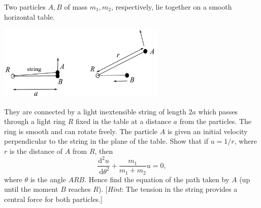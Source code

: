 \documentclass[answers]{exam}
\begin{document}
\begin{questions}
\question%
Two particles $A, B$ of mass $m_{1}, m_{2}$, respectively, lie together on a smooth horizontal table.
\begin{center}\includegraphics[width=8cm]{sheet 6 diagram}\end{center}
They are connected by a light inextensible string of length $2 a$ which passes through a light ring $R$ fixed in the table at a distance $a$ from the particles. The ring is smooth and can rotate freely. The particle $A$ is given an initial velocity perpendicular to the string in the plane of the table. Show that if $u=1 / r$, where $r$ is the distance of $A$ from $R$, then \[
	\frac{\mathrm{d}^{2} u}{\mathrm{~d} \theta^{2}}+\frac{m_{1}}{m_{1}+m_{2}} u=0,
\] where $\theta$ is the angle $A R B$. Hence find the equation of the path taken by $A$ (up until the moment $B$ reaches $R$). [\emph{Hint}: The tension in the string provides a central force for both particles.]

\end{questions}
\end{document}
